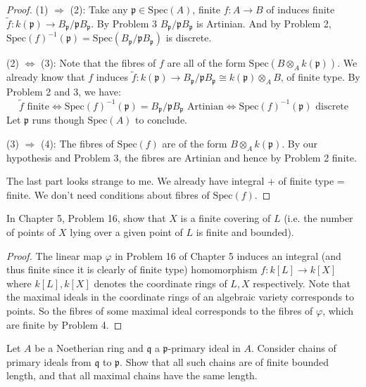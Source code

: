 \documentclass{solution}
\begin{document}
\begin{proof}
    (1) $\Rightarrow$ (2): Take any $\mathfrak{p} \in \mathrm{Spec}(A)$, finite $f: A \rightarrow B$ of induces finite $\tilde{f}: k(\mathfrak{p}) \rightarrow B_{\mathfrak{p}} / \mathfrak{p} B_{\mathfrak{p}}$. By Problem 3 $B_{\mathfrak{p}} / \mathfrak{p} B_{\mathfrak{p}}$ is Artinian. And by Problem 2, $\mathrm{Spec}(f) ^{-1}(\mathfrak{p}) = \mathrm{Spec}(B_{\mathfrak{p}} / \mathfrak{p} B_{\mathfrak{p}})$ is discrete.

    (2) $\Leftrightarrow$ (3): Note that the fibres of $f$ are all of the form $\mathrm{Spec}(B \otimes_A k(\mathfrak{p}))$. We already know that $f$ induces $\tilde{f}: k(\mathfrak{p}) \rightarrow B_{\mathfrak{p}} / \mathfrak{p} B_{\mathfrak{p}} \cong k(\mathfrak{p}) \otimes_A B$, of finite type. By Problem 2 and 3, we have:
    $$\tilde{f} \text{ finite} \Leftrightarrow  \mathrm{Spec}(f)^{-1}(\mathfrak{p}) = B_{\mathfrak{p}} / \mathfrak{p} B_{\mathfrak{p}} \text{ Artinian} \Leftrightarrow \mathrm{Spec}(f)^{-1}(\mathfrak{p}) \text{ discrete}$$
    Let $\mathfrak{p}$ runs though $\mathrm{Spec}(A)$ to conclude.

    (3) $\Rightarrow$ (4): The fibres of $\mathrm{Spec}(f)$ are of the form $B \otimes_A k(\mathfrak{p})$. By our hypothesis and Problem 3, the fibres are Artinian and hence by Problem 2 finite.

    {\color{red} The last part looks strange to me. We already have integral + of finite type = finite. We don't need conditions about fibres of $\mathrm{Spec}(f)$.}
\end{proof}

\begin{problem}
    In Chapter 5, Problem 16, show that $X$ is a finite covering of $L$ (i.e. the number of points of $X$ lying over a given point of $L$ is finite and bounded).
\end{problem}

\begin{proof}
    The linear map $\varphi$ in Problem 16 of Chapter 5 induces an integral (and thus finite since it is clearly of finite type) homomorphism $f: k[L] \rightarrow k[X]$ where $k[L], k[X]$ denotes the coordinate rings of $L, X$ respectively. Note that the maximal ideals in the coordinate rings of an algebraic variety corresponds to points. So the fibres of some maximal ideal corresponds to the fibres of $\varphi$, which are finite by Problem 4.
\end{proof}

\begin{problem}
    Let $A$ be a Noetherian ring and $\mathfrak{q}$ a $\mathfrak{p}$-primary ideal in $A$. Consider chains of primary ideals from $\mathfrak{q}$ to $\mathfrak{p}$. Show that all such chains are of finite bounded length, and that all maximal chains have the same length.
\end{problem}
\end{document}

